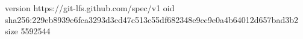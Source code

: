 version https://git-lfs.github.com/spec/v1
oid sha256:229eb8939e6fca3293d3cd47c513c55df682348e9cc9e0a4b64012d657bad3b2
size 5592544
